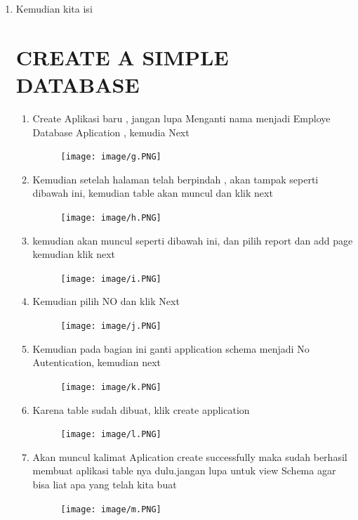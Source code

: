 \documentclass{article}
\begin{document}
\begin{enumerate}
\begin{enumerate}
\begin{enumerate}
    \newpage \item Kemudian kita isi
\newpage \section{CREATE A SIMPLE DATABASE}
\begin{enumerate}
    \item Create Aplikasi baru , jangan lupa Menganti nama menjadi Employe Database Aplication , kemudia Next
    \begin{figure}[h]
          \newpage  \centerline{\texttt{[image: image/g.PNG]}}
            \end{figure}
    \item Kemudian setelah halaman telah berpindah , akan tampak seperti dibawah ini, kemudian table akan muncul dan klik next
    \begin{figure}[h]
            \centerline{\texttt{[image: image/h.PNG]}}
            \end{figure}
    \newpage \item kemudian akan muncul seperti dibawah ini, dan pilih report dan add page kemudian  klik next
\begin{figure}[h]
            \centerline{\texttt{[image: image/i.PNG]}}
            \end{figure}
    \item Kemudian pilih NO dan klik Next
    \begin{figure}[h]
    \centerline{\texttt{[image: image/j.PNG]}}
            \end{figure}
    \item Kemudian pada bagian ini ganti application schema menjadi No Autentication, kemudian next
    \begin{figure}[h]
        \newpage\centerline{\texttt{[image: image/k.PNG]}}
    \end{figure}
    \newpage \item Karena  table sudah  dibuat, klik create application
    \begin{figure}[h]
        \newpage\centerline{\texttt{[image: image/l.PNG]}}
    \end{figure}
    \item Akan muncul kalimat Aplication create successfully maka sudah berhasil membuat aplikasi table nya dulu.jangan lupa untuk view Schema agar bisa liat apa yang telah kita buat
    \begin{figure}[h]
        \centerline{\texttt{[image: image/m.PNG]}}
    \end{figure}

\end{enumerate}
\end{enumerate}
\end{enumerate}
\end{enumerate}
\end{document}
